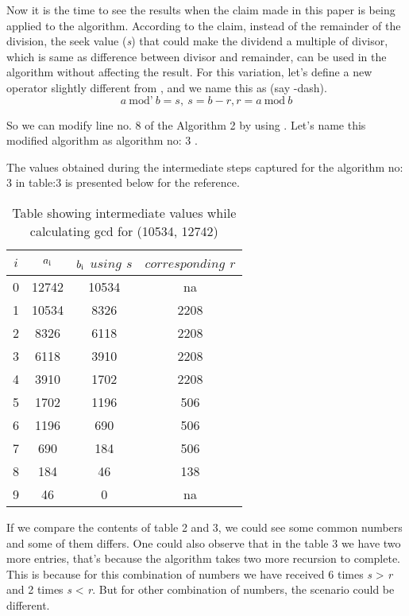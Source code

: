 \documentclass[conference,compsoc]{IEEEtran}
\newcommand{\var}[1]{\textit{#1}}
\renewcommand{\mod}{\text{mod}}
\newcommand{\moddash}{\text{mod'}}
\begin{document}
Now it is the time to see the results when the claim made in this paper is being applied 
to the algorithm. According to the claim, instead of the remainder of the division, the seek value (\var{s}) that could make the dividend a multiple of divisor, which is same as difference between divisor and remainder, can be used in the algorithm without affecting the result. 
For this variation, let's define a new operator slightly different from \mod, and we name this as \moddash(say \mod -dash).
\begin{equation} \label{eq:gcd_modulus_1_1}
\var{a} \> \moddash \> \var{b} = \var{s}, \>  {s} = \var{b} - \var{r}, \var{r} = \var{a} \> \mod \> \var{b}
\end{equation}
  
So we can modify line no. 8 of the Algorithm 2 by using \moddash. Let's name this modified algorithm as algorithm no: 3 .  \linebreak


The values obtained during the intermediate steps captured for the algorithm no: 3 in table:3 is presented below for the reference.
\begin{table}[!htbp]
\caption{Table showing intermediate values while calculating gcd for (10534, 12742)}
\label{table:3}
\centering
	\begin{tabular}{c | c | c | c}
		\hline
		$i$ & $a\textsubscript{i}$ & $b\textsubscript{i} $ $using $ $s$ & $corresponding $ $r$\\ [0.5ex] 
		\hline
		0 & 12742 & 10534 & na  \\ 
		1 & 10534 & 8326  & 2208\\  
		2 & 8326  & 6118  & 2208\\
		3 & 6118  & 3910  & 2208\\
		4 & 3910   & 1702 & 2208\\
		5 & 1702   & 1196 & 506\\
		6 & 1196   & 690  & 506\\
		7 & 690    & 184  & 506\\
		8 & 184    & 46   & 138\\
		9 & 46     & 0    & na
	\end{tabular}
\end{table}

If we compare the contents of table 2 and 3, we could see some common numbers and some of them differs. One could also observe that in the table 3 we have two more entries, that's because the algorithm takes two more recursion to complete. This is because for 
this combination of numbers we have received 6 times \var{s} > \var{r} and 2 times 
\var{s} < \var{r}. But for other combination of numbers, the scenario could be different.
\end{document}
